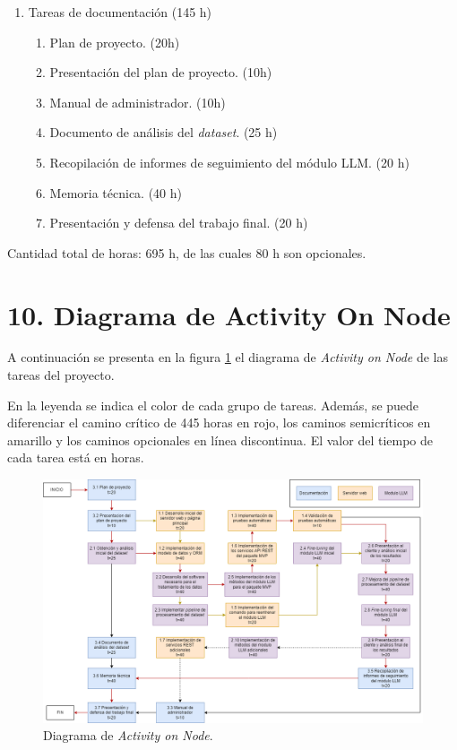 \documentclass[
11pt, %
]{Clases/charter}
\begin{document}
\begin{enumerate}
\begin{enumerate}
	      \end{enumerate}
	\item Tareas de documentación (145 h)
	      \begin{enumerate}
		      \item Plan de proyecto. (20h)
		      \item Presentación del plan de proyecto. (10h)
		      \item Manual de administrador. (10h)
		      \item Documento de análisis del \textit{dataset}. (25 h)
		      \item Recopilación de informes de seguimiento del módulo LLM. (20 h)
		      \item Memoria técnica. (40 h)
		      \item Presentación y defensa del trabajo final. (20 h)
	      \end{enumerate}
\end{enumerate}

Cantidad total de horas: 695 h, de las cuales 80 h son opcionales.
\section{10. Diagrama de Activity On Node}
\label{sec:AoN}
A continuación se presenta en la figura \ref{fig:AoN} el diagrama de \textit{Activity on Node} de las tareas del proyecto.

En la leyenda se indica el color de cada grupo de tareas.
Además, se puede diferenciar el camino crítico de 445 horas en rojo, los caminos semicríticos en amarillo y los caminos opcionales en línea discontinua.
El valor del tiempo de cada tarea está en horas.
\begin{figure}[htpb]
	\centering
	\includegraphics[width=.75\paperwidth]{./Figuras/AoN.png}
	\caption{Diagrama de \textit{Activity on Node}.}
	\label{fig:AoN}
\end{figure}
\end{document}
